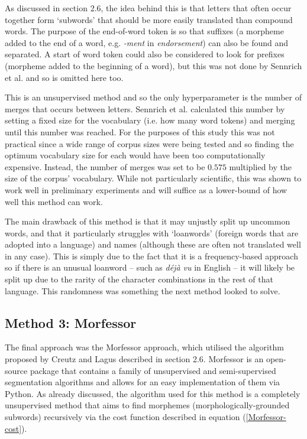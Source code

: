 \documentclass[11pt]{article}
\begin{document}
\bigskip

As discussed in section 2.6, the idea behind this is that letters that often occur together form ‘subwords’ that should be more easily translated than compound words. The purpose of the end-of-word token is so that suffixes (a morpheme added to the end of a word, e.g. \textit{-ment} in \textit{endorsement}) can also be found and separated. A start of word token could also be considered to look for prefixes (morpheme added to the beginning of a word), but this was not done by Sennrich et al. and so is omitted here too.

\bigskip

This is an unsupervised method and so the only hyperparameter is the number of merges that occurs between letters. Sennrich et al. \citeyearpar{sennrich-etal-2016-neural} calculated this number by setting a fixed size for the vocabulary (i.e. how many word tokens) and merging until this number was reached. For the purposes of this study this was not practical since a wide range of corpus sizes were being tested and so finding the optimum vocabulary size for each would have been too computationally expensive. Instead, the number of merges was set to be $0.575$ multiplied by the size of the corpus’ vocabulary. While not particularly scientific, this was shown to work well in preliminary experiments and will suffice as a lower-bound of how well this method can work.

\bigskip

The main drawback of this method is that it may unjustly split up uncommon words, and that it particularly struggles with `loanwords' (foreign words that are adopted into a language) and names (although these are often not translated well in any case). This is simply due to the fact that it is a frequency-based approach so if there is an unusual loanword -- such as \textit{déjà vu} in English -- it will likely be split up due to the rarity of the character combinations in the rest of that language. This randomness was something the next method looked to solve.

\subsection{Method 3: Morfessor}

The final approach was the Morfessor approach, which utilised the algorithm proposed by Creutz and Lagus \citeyearpar{creutz-lagus-2002-unsupervised} described in section 2.6. Morfessor \citep{virpioja2013morfessor} is an open-source package that contains a family of unsupervised and semi-supervised segmentation algorithms and allows for an easy implementation of them via Python. As already discussed, the algorithm used for this method is a completely unsupervised method that aims to find morphemes (morphologically-grounded subwords) recursively via the cost function described in equation (\ref{Morfessor-cost}).
\end{document}
